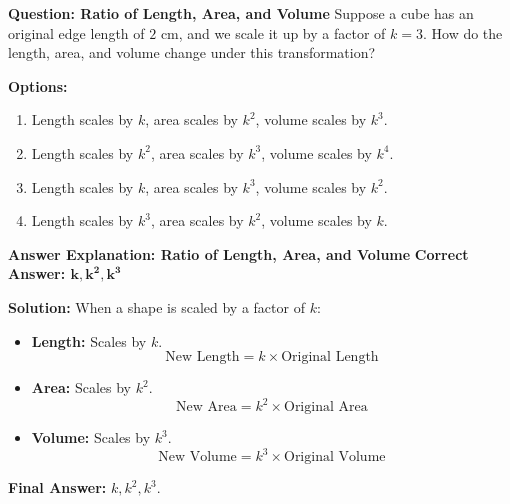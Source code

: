 \documentclass{beamer}
\begin{document}
\begin{frame}{\textbf{Question: Ratio of Length, Area, and Volume}}
    Suppose a cube has an original edge length of \( 2 \) cm, and we scale it up by a factor of \( k = 3 \).  
    How do the length, area, and volume change under this transformation?

    \vspace{0.5cm}
    \textbf{Options:}
    \begin{enumerate}
        \item[A] Length scales by \( k \), area scales by \( k^2 \), volume scales by \( k^3 \).
        \item[B] Length scales by \( k^2 \), area scales by \( k^3 \), volume scales by \( k^4 \).
        \item[C] Length scales by \( k \), area scales by \( k^3 \), volume scales by \( k^2 \).
        \item[D] Length scales by \( k^3 \), area scales by \( k^2 \), volume scales by \( k \).
    \end{enumerate}
\end{frame}

\begin{frame}{\textbf{Answer Explanation: Ratio of Length, Area, and Volume}}
    \textbf{Correct Answer: \textcolor{novelPurple}{\(\mathbf{k, k^2, k^3}\)}}  

    \vspace{0.3cm}
    \textbf{Solution:}  
    When a shape is scaled by a factor of \( k \):

    \begin{itemize}
        \item \textbf{Length:} Scales by \( k \).
        \[
        \text{New Length} = k \times \text{Original Length}
        \]

        \item \textbf{Area:} Scales by \( k^2 \).
        \[
        \text{New Area} = k^2 \times \text{Original Area}
        \]

        \item \textbf{Volume:} Scales by \( k^3 \).
        \[
        \text{New Volume} = k^3 \times \text{Original Volume}
        \]
    \end{itemize}



    \textbf{Final Answer:} \( \boxed{k, k^2, k^3} \).
\end{frame}
\end{document}
